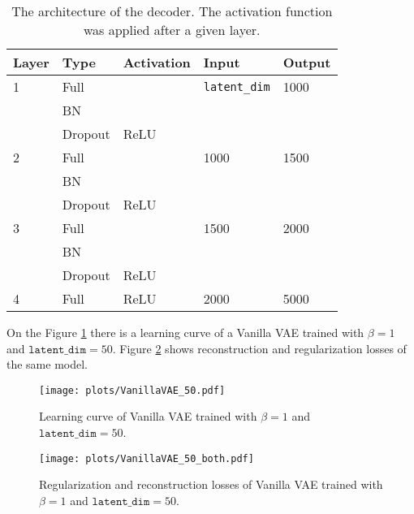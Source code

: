\documentclass[a4paper,11pt]{article}
\begin{document}
\begin{table}[H]
\centering
\begin{tabular}{|l l l l l|}
\hline
 \textbf{Layer} & \textbf{Type} &  \textbf{Activation} &  \textbf{Input} &  \textbf{Output} \\ \hline
 1 & Full &   &  \texttt{latent\_dim} &  1000 \\ \
   & BN &   &   &    \\ \
   & Dropout &  ReLU &   &    \\ \hline
 2 & Full &   &  1000 &  1500 \\ \
   & BN &   &   &   \\ \
   & Dropout &  ReLU &   &    \\ \hline
 3 & Full &   &  1500 &  2000 \\ \
   & BN &   &   &   \\ \
   &Dropout &  ReLU &   &    \\ \hline
 4 & Full &  ReLU &  2000 &  5000 \\ \hline
\end{tabular}
\label{decoder1}
\caption{The architecture of the decoder. The activation function was applied after a given layer.}
\end{table}
\noindent On the Figure \ref{VAE1} there is a learning curve of a Vanilla VAE trained with $\beta = 1$ and $\texttt{latent\_dim}=50$. Figure \ref{VAE2} shows reconstruction and regularization losses of the same model.
\begin{figure}[H]
    \centering
    \texttt{[image: plots/VanillaVAE\_50.pdf]}
    \caption{Learning curve of Vanilla VAE trained with $\beta=1$ and  $\texttt{latent\_dim}=50$.}
    \label{VAE1}
\end{figure}

\begin{figure}[H]
    \centering
    \texttt{[image: plots/VanillaVAE\_50\_both.pdf]}
    \caption{Regularization and reconstruction losses of Vanilla VAE trained with $\beta=1$ and  $\texttt{latent\_dim}=50$.}
    \label{VAE2}
\end{figure}
\end{document}
